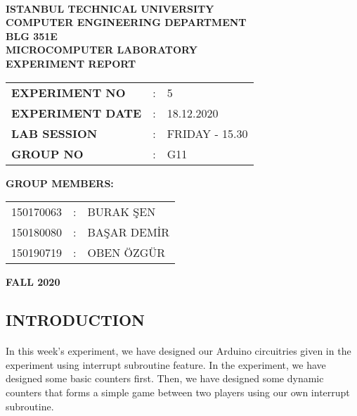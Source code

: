 \documentclass[pdftex,12pt,a4paper]{article}
\begin{document}
\begin{titlepage}
\begin{center}
\textbf{}\\
\textbf{\Large{ISTANBUL TECHNICAL UNIVERSITY}}\\
\vspace{0.5cm}
\textbf{\Large{COMPUTER ENGINEERING DEPARTMENT}}\\
\vspace{2cm}
\textbf{\Large{BLG 351E\\ MICROCOMPUTER LABORATORY\\ EXPERIMENT REPORT}}\\
\vspace{2.8cm}
\begin{table}[ht]
\centering
\Large{
\begin{tabular}{lcl}
\textbf{EXPERIMENT NO}  & : & 5 \\
\textbf{EXPERIMENT DATE}  & : & 18.12.2020 \\
\textbf{LAB SESSION}  & : & FRIDAY - 15.30 \\
\textbf{GROUP NO}  & : & G11 \\
\end{tabular}}
\end{table}
\vspace{1cm}
\textbf{\Large{GROUP MEMBERS:}}\\
\begin{table}[ht]
\centering
\Large{
\begin{tabular}{rcl}
150170063 & : & BURAK ŞEN \\
150180080  & : & BAŞAR DEMİR \\
150190719  & : &  OBEN ÖZGÜR \\
\end{tabular}}
\end{table}
\vspace{2.8cm}
\textbf{\Large{FALL 2020}}

\end{center}

\end{titlepage}

\thispagestyle{empty}
\setcounter{tocdepth}{4}
\tableofcontents
\clearpage
\setcounter{page}{1}
\newpage
\begin{flushleft}
\section{INTRODUCTION}
\paragraph{}
In this week's experiment, we have designed our Arduino circuitries given in the experiment using interrupt subroutine feature. In the experiment, we have designed some basic counters first. Then, we have designed some dynamic counters that forms a simple game between two players using our own interrupt subroutine.


\end{flushleft} 
\end{document}
